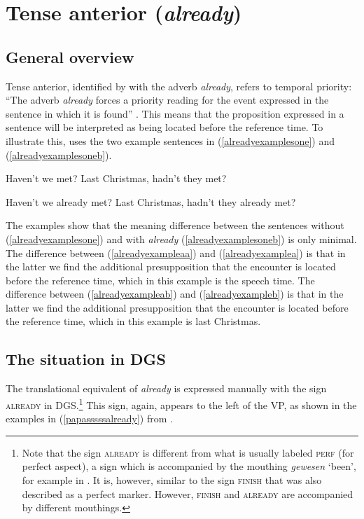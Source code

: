 \section{Tense anterior (\textit{already})}
\subsection{General overview}
Tense anterior, identified by \citet[94]{cinque1999adverbs} with the adverb \textit{already}, refers to temporal priority: ``The adverb \textit{already} forces a priority reading for the event expressed in the sentence in which it is found'' \citep[547]{hornstein1977towards}. This means that the proposition expressed in a sentence will be interpreted as being located before the reference time. To illustrate this, \citet[94]{cinque1999adverbs} uses the two example sentences in (\ref{alreadyexamplesone}) and (\ref{alreadyexamplesoneb}).

\begin{exe}
\ex\label{alreadyexamplesone}\begin{xlist} 
\ex Haven't we met? \label{alreadyexampleaa}
\ex Last Christmas, hadn't they met? \label{alreadyexampleab}
\end{xlist}
\end{exe} 

\begin{exe}
\ex\label{alreadyexamplesoneb}\begin{xlist}  
\ex Haven't we already met? \label{alreadyexamplea}
\ex Last Christmas, hadn't they already met? \label{alreadyexampleb}
\end{xlist}
\end{exe} 

\noindent The examples show that the meaning difference between the sentences without (\ref{alreadyexamplesone}) and with \textit{already} (\ref{alreadyexamplesoneb}) is only minimal. The difference between (\ref{alreadyexampleaa}) and (\ref{alreadyexamplea}) is that in the latter we find the additional presupposition that the encounter is located before the reference time, which in this example is the speech time. The difference between (\ref{alreadyexampleab}) and (\ref{alreadyexampleb}) is that in the latter we find the additional presupposition that the encounter is located before the reference time, which in this example is last Christmas.

\subsection{The situation in DGS}
The translational equivalent of \textit{already} is expressed manually with the sign \textsc{already} in DGS.\footnote{ Note that the sign \textsc{already} is different from what is usually labeled \textsc{perf} (for perfect aspect), a sign which is accompanied by the mouthing \textit{gewesen} `been', for example in \citet[292]{happ2014vork}. It is, however, similar to the sign \textsc{finish} that was also described as a perfect marker. However, \textsc{finish} and \textsc{already} are accompanied by different mouthings.} This sign, again, appears to the left of the VP, as shown in the examples in (\ref{papasssssalready}) from \citet[155]{papaspyrou2008grammatik}.

